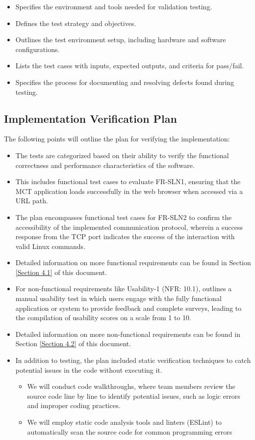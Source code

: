 \documentclass[12pt, titlepage]{article}
\begin{document}
\begin{itemize}
    \item Specifies the environment and tools needed for validation testing.
    \item Defines the test strategy and objectives.
    \item Outlines the test environment setup, including hardware and software configurations.
    \item Lists the test cases with inputs, expected outputs, and criteria for pass/fail.
    \item Specifies the process for documenting and resolving defects found during testing.
\end{itemize}

\subsection{Implementation Verification Plan}

The following points will outline the plan for verifying the implementation:
\begin{itemize}
    \item The tests are categorized based on their ability to verify the functional correctness and performance characteristics of the software.
    \item This includes functional test cases to evaluate FR-SLN1, ensuring that the MCT application loads successfully in the web browser when accessed via a URL path.
    \item The plan encompasses functional test cases for FR-SLN2 to confirm the accessibility of the implemented communication protocol, wherein a success response from the TCP port indicates the success of the interaction with valid Linux commands. 
    \item Detailed information on more functional requirements can be found in Section \ref{Section 4.1} of this document.
    \item For non-functional requirements like Usability-1 (NFR: 10.1), outlines a manual usability test in which users engage with the fully functional application or system to provide feedback and complete surveys, leading to the compilation of usability scores on a scale from 1 to 10.
    \item Detailed information on more non-functional requirements can be found in Section \ref{Section 4.2} of this document.
    \item In addition to testing, the plan included static verification techniques to catch potential issues in the code without executing it. 
    \begin{itemize}
        \item We will conduct code walkthroughs, where team members review the source code line by line to identify potential issues, such as logic errors and improper coding practices.
        \item We will employ static code analysis tools and linters (ESLint) to automatically scan the source code for common programming errors 
    \end{itemize}
\end{itemize}
\end{document}
